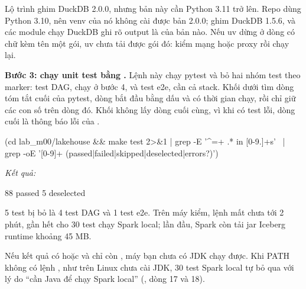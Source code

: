 Lộ trình ghim DuckDB 2.0.0, nhưng bản này cần Python 3.11 trở lên. Repo dùng Python 3.10, nên venv của nó không cài được bản 2.0.0;  ghim DuckDB 1.5.6, và các module chạy DuckDB ghi rõ output là của bản nào. Nếu uv dừng ở dòng có chữ  kèm tên một gói, uv chưa tải được gói đó: kiểm mạng hoặc proxy rồi chạy lại.

\textbf{Bước 3: chạy unit test bằng .} Lệnh này chạy pytest và bỏ hai nhóm test theo marker: test DAG, chạy ở bước 4, và test e2e, cần cả stack. Khối dưới tìm dòng tóm tắt cuối của pytest, dòng bắt đầu bằng dấu \code{=} và có thời gian chạy, rồi chỉ giữ các con số trên dòng đó. Khối không lấy dòng cuối cùng, vì khi có test lỗi, dòng cuối là thông báo lỗi của .

\begin{codeblock}
(cd lab_m00/lakehouse && make test 2>&1 | grep -E '^=+ .* in [0-9.]+s' \
  | grep -oE '[0-9]+ (passed|failed|skipped|deselected|errors?)')
\end{codeblock}
\textit{Kết quả:}
\begin{codeblock}
88 passed
5 deselected
\end{codeblock}

5 test bị bỏ là 4 test DAG và 1 test e2e. Trên máy kiểm, lệnh mất chưa tới 2 phút, gần hết cho 30 test chạy Spark local; lần đầu, Spark còn tải jar Iceberg runtime khoảng 45 MB.

Nếu kết quả có  hoặc  và chỉ còn , máy bạn chưa có JDK chạy được. Khi PATH không có lệnh , như trên Linux chưa cài JDK, 30 test Spark local tự bỏ qua với lý do ``cần Java để chạy Spark local'' (, dòng 17 và 18).

